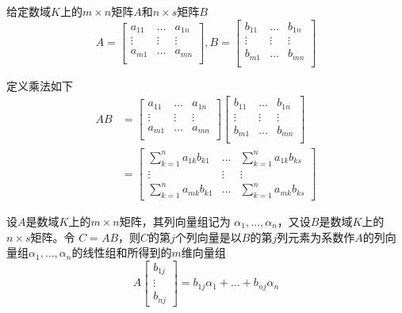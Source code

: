 \documentclass[11pt]{article}
\begin{document}
\begin{definition}[]
给定数域\(K\)上的\(m\times n\)矩阵\(A\)和\(n\times s\)矩阵\(B\)
\begin{equation*}
A=
\begin{bmatrix}
a_{11}&\dots&a_{1n}\\
\vdots&\vdots&\vdots\\
a_{m1}&\dots&a_{mn}\\
\end{bmatrix},B=
\begin{bmatrix}
b_{11}&\dots&b_{1n}\\
\vdots&\vdots&\vdots\\
b_{m1}&\dots&b_{mn}\\
\end{bmatrix}
\end{equation*}

定义乘法如下
\begin{align*}
AB&=
\begin{bmatrix}
a_{11}&\dots&a_{1n}\\
\vdots&\vdots&\vdots\\
a_{m1}&\dots&a_{mn}\\
\end{bmatrix}
\begin{bmatrix}
b_{11}&\dots&b_{1n}\\
\vdots&\vdots&\vdots\\
b_{m1}&\dots&b_{mn}\\
\end{bmatrix}\\
&=
\begin{bmatrix}
\sum_{k=1}^na_{1k}b_{k1}&\dots&
\sum_{k=1}^na_{1k}b_{ks}\\
\vdots&\vdots&\vdots\\
\sum_{k=1}^na_{mk}b_{k1}&\dots&
\sum_{k=1}^na_{mk}b_{ks}
\end{bmatrix}
\end{align*}
\end{definition}

\begin{proposition}[]
设\(A\)是数域\(K\)上的\(m\times n\)矩阵，其列向量组记为
\(\alpha_1,\dots,\alpha_n\)，又设\(B\)是数域\(K\)上的\(n\times s\)矩阵。令
\(C=AB\)，则\(C\)的第\(j\)个列向量是以\(B\)的第\(j\)列元素为系数作\(A\)的列向
量组\(\alpha_1,\dots,\alpha_n\)的线性组和所得到的\(m\)维向量组
\begin{equation*}
A
\begin{bmatrix}
b_{1j}\\
\vdots\\
b_{nj}
\end{bmatrix}=b_{1j}\alpha_1+\dots+b_{nj}\alpha_n
\end{equation*}
\end{proposition}
\end{document}
